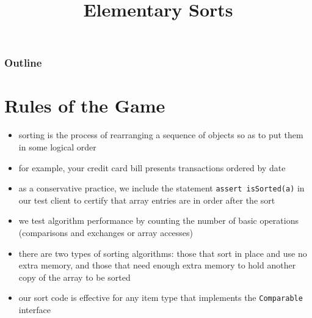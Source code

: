 \documentclass[8pt,a4paper,compress]{beamer}
\title{Elementary Sorts}
\date{}
\begin{document}
\begin{frame}
\vfill
\titlepage
\end{frame}

\begin{frame}
\frametitle{Outline}
\tableofcontents
\end{frame}

\section{Rules of the Game}
\begin{frame}[fragile]
\begin{itemize}
\item sorting is the process of rearranging a sequence of objects so as to put them in some logical order

\item for example, your credit card bill presents transactions ordered by date

\item as a conservative practice, we include the statement \lstinline{assert isSorted(a)} in our test client to certify that array entries are in order after the sort

\item we test algorithm performance by counting the number of basic
operations (comparisons and exchanges or array accesses)

\item there are two types of sorting algorithms: those that sort in place and use no extra memory, and those that need enough extra memory to hold another copy of the array to be sorted

\item our sort code is effective for any item type that implements the \lstinline{Comparable} interface
\end{itemize}
\end{frame}
\end{document}
